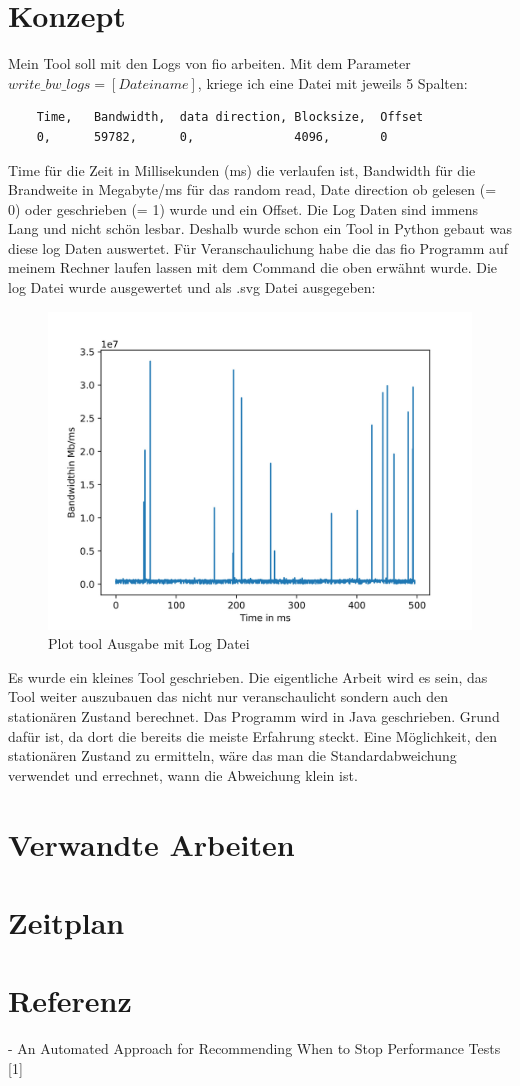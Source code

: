 \documentclass{article}
\begin{document}
\section{Konzept}
Mein Tool soll mit den Logs von fio arbeiten. \newline
Mit dem Parameter $write\_bw\_logs=[Dateiname]$, kriege ich eine Datei mit jeweils 5 Spalten:
\begin{lstlisting}
    Time,	Bandwidth,	data direction, Blocksize,	Offset
    0, 	    59782, 		0,		        4096,		0
\end{lstlisting}
Time für die Zeit in Millisekunden (ms) die verlaufen ist, Bandwidth für die Brandweite in Megabyte/ms
für das random read, Date direction ob gelesen (= 0) oder geschrieben (= 1) wurde
und ein Offset. Die Log Daten sind immens Lang und nicht schön lesbar. Deshalb wurde schon ein Tool in Python gebaut 
was diese log Daten auswertet. Für Veranschaulichung habe die das fio Programm auf meinem Rechner laufen lassen mit dem
Command die oben erwähnt wurde. Die log Datei wurde ausgewertet und als .svg Datei ausgegeben:
\begin{figure}[ht!]
    \centering
    \includegraphics[width=120mm]{./Code/nm_mytest_bw.jpg}
    \caption{Plot tool Ausgabe mit Log Datei  \label{overflow}}
    \end{figure}

Es wurde ein kleines Tool geschrieben. Die eigentliche Arbeit wird es sein, das Tool weiter auszubauen das nicht nur veranschaulicht
sondern auch den stationären Zustand berechnet. Das Programm wird in Java geschrieben. Grund dafür ist, da dort die bereits die meiste Erfahrung steckt.
Eine Möglichkeit, den stationären Zustand zu ermitteln, wäre das man die Standardabweichung verwendet und errechnet, wann die Abweichung klein ist.  
\section{Verwandte Arbeiten}
\section{Zeitplan}
\section{Referenz}
- An Automated Approach for Recommending When to Stop Performance Tests [1]
\end{document}
